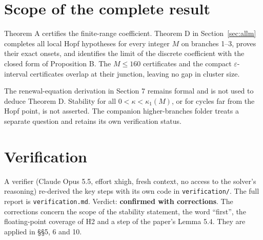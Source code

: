 \documentclass[11pt,a4paper]{report}
\begin{document}
\section{Scope of the complete result}

Theorem A certifies the finite-range coefficient. Theorem D in Section~\ref{sec:allm}
completes all local Hopf hypotheses for every integer $M$ on branches 1--3, proves their
exact onsets, and identifies the limit of the discrete coefficient with the closed form
of Proposition B. The $M\le160$ certificates and the compact $\varepsilon$-interval
certificates overlap at their junction, leaving no gap in cluster size.

The renewal-equation derivation in Section 7 remains formal and is not used to deduce
Theorem D. Stability for all $0<\kappa<\kappa_1(M)$, or for cycles far from the Hopf point,
is not asserted. The companion higher-branches folder treats a separate question and
retains its own verification status.

\section{Verification}

A verifier (Claude Opus 5.5, effort xhigh, fresh context, no access to the solver's reasoning) re-derived
the key steps with its own code in \texttt{verification/}. The full report is \texttt{verification.md}. Verdict:
\textbf{confirmed with corrections}. The corrections concern the scope of the stability statement, the word
``first'', the floating-point coverage of H2 and a step of the paper's Lemma 5.4. They are applied in §§5, 6 and 10.
\end{document}
